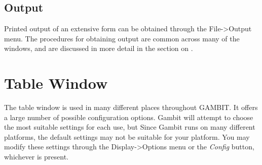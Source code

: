 \subsection{Output} 
Printed output of an extensive form can be obtained through the File->Output 
menu.  The procedures for obtaining output are common across many of the 
windows, and are discussed in more detail in the section on 
. 

\section{Table Window}\label{TableWindow}
The table window is used in many different places throughout GAMBIT.  It 
offers a large number of possible configuration options.  Gambit 
will attempt to choose the most suitable settings for each use, but
Since Gambit runs on many different platforms, the default settings 
may not be suitable for your platform.  You may modify these settings 
through the Display->Options menu or the {\em Config} button, whichever is
present.

